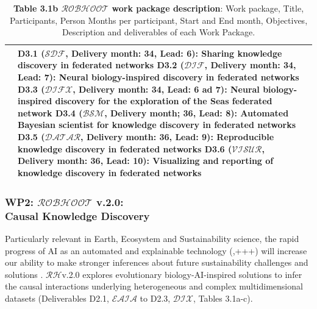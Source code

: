\documentclass[11pt, a4paper]{article} %
\begin{document}
\begin{table}[h!]
\begin{center}
{\begin{tabular}{|m{3cm} || m{12cm} || m{1cm}|}
{    \hline
    \rowcolor{piggypink!20}
    {\bf Deliverables} & {\bf D3.1 ($\mathcal{SDF}$}, Delivery month: 34, Lead: 6): Sharing knowledge discovery in federated networks
                         {\bf D3.2 ($\mathcal{DIF}$}, Delivery month: 34, Lead: 7): Neural biology-inspired discovery in federated networks 
                         {\bf D3.3 ($\mathcal{DIFX}$}, Delivery month: 34, Lead: 6 ad 7): Neural biology-inspired discovery for the exploration of the Seas federated network
                         {\bf D3.4 ($\mathcal{BSM}$}, Delivery month; 36, Lead: 8): Automated Bayesian scientist for knowledge discovery in federated networks
                         {\bf D3.5 ($\mathcal{DATAR}$}, Delivery month: 36, Lead: 9): Reproducible knowledge discovery in federated networks
                         {\bf D3.6 ($\mathcal{VISUR}$}, Delivery month: 36, Lead: 10): Visualizing and reporting of knowledge discovery in federated networks & \\
    \hline\hline\hline
                 \end{tabular}
                 }
\end{center}
\caption*{{{\bf Table 3.1b  $\mathcal{ROBHOOT}$ work package description}: Work package,
    Title, Participants, Person Months per participant, Start and End
    month, Objectives, Description and deliverables of each Work
    Package.}}
\end{table}

\subsubsection{{\bf WP2: $\mathcal{ROBHOOT}$ v.2.0}: \\
  Causal Knowledge Discovery}

Particularly relevant in Earth, Ecosystem and Sustainability science,
the rapid progress of AI as an automated and explainable technology
(\citep{OHare2015,Gil2019,Cranmer2019,Guimera2020,Real2020,Futia2020},+++)
will increase our ability to make stronger inferences about future
sustainability challenges and solutions
\citep{Reichstein}. $\mathcal{RH}$v.2.0 explores evolutionary
biology-AI-inspired solutions to infer the causal interactions
underlying heterogeneous and complex multidimensional datasets
(Deliverables D2.1, $\mathcal{EAIA}$ to D2.3, $\mathcal{DIX}$, Tables
3.1a-c).
\end{document}
